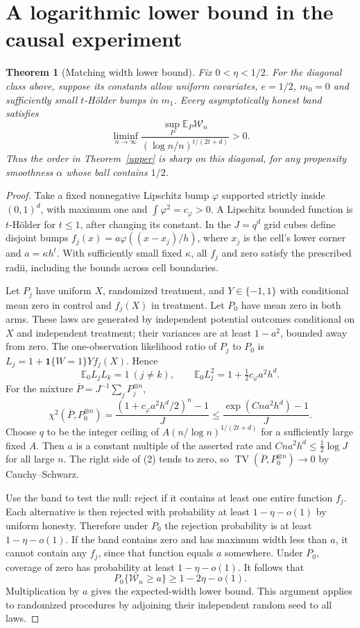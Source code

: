 \documentclass[11pt]{article}
\newtheorem{theorem}{Theorem}
\theoremstyle{remark}
\newcommand{\E}{\mathbb E}
\newcommand{\Ind}{\mathbf 1}
\newcommand{\TV}{\operatorname{TV}}
\begin{document}
\section{A logarithmic lower bound in the causal experiment}
\begin{theorem}[Matching width lower bound]\label{lower}
Fix $0<\eta<1/2$. For the diagonal class above, suppose its constants allow uniform covariates, $e=1/2$, $m_0=0$ and sufficiently small $t$-H\"older bumps in $m_1$. Every asymptotically honest band satisfies
\[
 \liminf_{n\to\infty}
 \frac{\sup_P\E_P\mathcal W_n}{(\log n/n)^{t/(2t+d)}}>0.
\]
Thus the order in Theorem~\ref{upper} is sharp on this diagonal, for any propensity smoothness $\alpha$ whose ball contains $1/2$.
\end{theorem}
\begin{proof}
Take a fixed nonnegative Lipschitz bump $\varphi$ supported strictly inside $(0,1)^d$, with maximum one and $\int\varphi^2=c_\varphi>0$. A Lipschitz bounded function is $t$-H\"older for $t\leq1$, after changing its constant. In the $J=q^d$ grid cubes define disjoint bumps
$f_j(x)=a\varphi((x-x_j)/h)$, where $x_j$ is the cell's lower corner and $a=\kappa h^t$. With sufficiently small fixed $\kappa$, all $f_j$ and zero satisfy the prescribed radii, including the bounds across cell boundaries.

Let $P_j$ have uniform $X$, randomized treatment, and $Y\in\{-1,1\}$ with conditional mean zero in control and $f_j(X)$ in treatment. Let $P_0$ have mean zero in both arms. These laws are generated by independent potential outcomes conditional on $X$ and independent treatment; their variances are at least $1-a^2$, bounded away from zero. The one-observation likelihood ratio of $P_j$ to $P_0$ is
$L_j=1+\Ind\{W=1\}Yf_j(X)$. Hence
\[
 \E_0 L_jL_k=1\ (j\ne k),\qquad
 \E_0 L_j^2=1+\tfrac12c_\varphi a^2h^d.
\]
For the mixture $\overline P=J^{-1}\sum_jP_j^{\otimes n}$,
\[
 \chi^2(\overline P,P_0^{\otimes n})
 =\frac{(1+c_\varphi a^2h^d/2)^n-1}{J}
 \leq\frac{\exp(Cna^2h^d)-1}{J}.\tag{2}
\]
Choose $q$ to be the integer ceiling of
$A(n/\log n)^{1/(2t+d)}$ for a sufficiently large fixed $A$. Then $a$ is a constant multiple of the asserted rate and $Cna^2h^d\leq\tfrac12\log J$ for all large $n$. The right side of (2) tends to zero, so $\TV(\overline P,P_0^{\otimes n})\to0$ by Cauchy--Schwarz.

Use the band to test the null: reject if it contains at least one entire function $f_j$. Each alternative is then rejected with probability at least $1-\eta-o(1)$ by uniform honesty. Therefore under $P_0$ the rejection probability is at least $1-\eta-o(1)$. If the band contains zero and has maximum width less than $a$, it cannot contain any $f_j$, since that function equals $a$ somewhere. Under $P_0$, coverage of zero has probability at least $1-\eta-o(1)$. It follows that
\[
 P_0\{\mathcal W_n\geq a\}\geq1-2\eta-o(1).
\]
Multiplication by $a$ gives the expected-width lower bound. This argument applies to randomized procedures by adjoining their independent random seed to all laws.
\end{proof}
\end{document}
